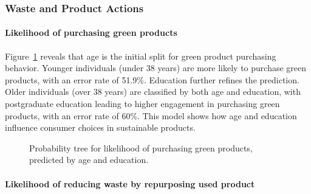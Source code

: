 \documentclass[
  letterpaper,
  DIV=11,
  numbers=noendperiod]{scrartcl}
\let\oldparagraph\paragraph
\renewcommand{\paragraph}[1]{\oldparagraph{#1}\mbox{}}
\begin{document}
\subsubsection{Waste and Product
Actions}\label{waste-and-product-actions}

\paragraph{Likelihood of purchasing green
products}\label{likelihood-of-purchasing-green-products}

Figure~\ref{fig-thirteen} reveals that age is the initial split for
green product purchasing behavior. Younger individuals (under 38 years)
are more likely to purchase green products, with an error rate of
51.9\%. Education further refines the prediction. Older individuals
(over 38 years) are classified by both age and education, with
postgraduate education leading to higher engagement in purchasing green
products, with an error rate of 60\%. This model shows how age and
education influence consumer choices in sustainable products.

\begin{figure}


\caption{\label{fig-thirteen}Probability tree for likelihood of
purchasing green products, predicted by age and education.}

\end{figure}%

\paragraph{Likelihood of reducing waste by repurposing used
product}\label{likelihood-of-reducing-waste-by-repurposing-used-product}
\end{document}
